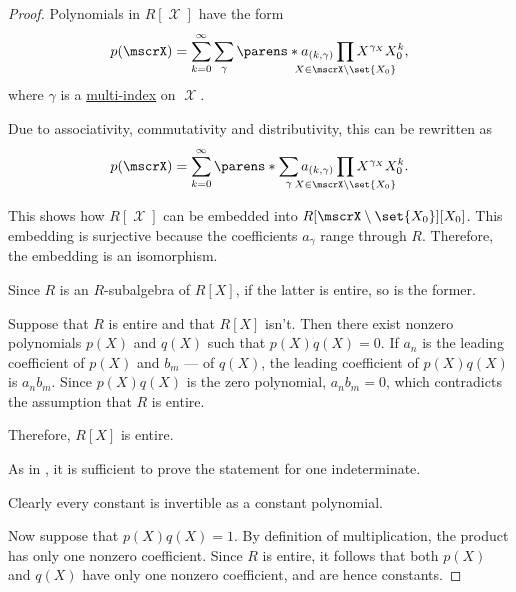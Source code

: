 \begin{proof}
   Polynomials in \( R[\mscrX] \) have the form
  \begin{equation*}
    p(\mscrX) = \sum_{k=0}^\infty \sum_\gamma \parens*{ a_{(k,\gamma)} \prod_{\mathclap{X \in \mscrX \setminus \set{ X_0 }}} X^{\gamma_X} } X_0^k,
  \end{equation*}
  where \( \gamma \) is a \hyperref[def:multi_index]{multi-index} on \( \mscrX \).

  Due to associativity, commutativity and distributivity, this can be rewritten as
  \begin{equation*}
    p(\mscrX) = \sum_{k=0}^\infty \parens*{ \sum_\gamma a_{(k,\gamma)} \prod_{\mathclap{X \in \mscrX \setminus \set{ X_0 }}} X^{\gamma_X} } X_0^k.
  \end{equation*}

  This shows how \( R[\mscrX] \) can be embedded into \( R[\mscrX \setminus \set{ X_0 }][X_0] \). This embedding is surjective because the coefficients \( a_\gamma \) range through \( R \). Therefore, the embedding is an isomorphism.


  \SufficiencySubProof Since \( R \) is an \( R \)-subalgebra of \( R[X] \), if the latter is entire, so is the former.

  \NecessitySubProof Suppose that \( R \) is entire and that \( R[X] \) isn't. Then there exist nonzero polynomials \( p(X) \) and \( q(X) \) such that \( p(X) q(X) = 0 \). If \( a_n \) is the leading coefficient of \( p(X) \) and \( b_m \) --- of \( q(X) \), the leading coefficient of \( p(X) q(X) \) is \( a_n b_m \). Since \( p(X) q(X) \) is the zero polynomial, \( a_n b_m = 0 \), which contradicts the assumption that \( R \) is entire.

  Therefore, \( R[X] \) is entire.

   As in , it is sufficient to prove the statement for one indeterminate.

  Clearly every constant is invertible as a constant polynomial.

  Now suppose that \( p(X) q(X) = 1 \). By definition of multiplication, the product has only one nonzero coefficient. Since \( R \) is entire, it follows that both \( p(X) \) and \( q(X) \) have only one nonzero coefficient, and are hence constants.
\end{proof}

